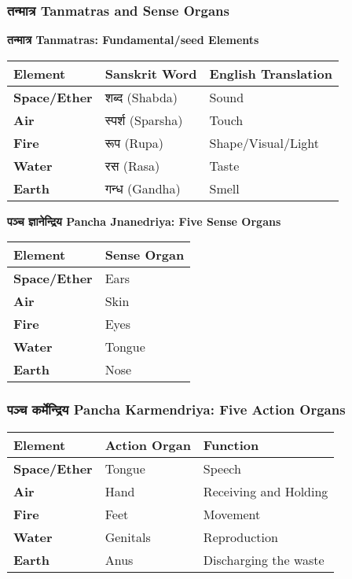 \begin{frame}[fragile]\frametitle{तन्मात्र Tanmatras and Sense Organs}
    \textbf{तन्मात्र Tanmatras: Fundamental/seed Elements}
	
	
    \begin{tabular}{|l|l|l|}
    \hline
    \textbf{Element} & \textbf{Sanskrit Word} & \textbf{English Translation} \\
    \hline
    \textbf{Space/Ether} & शब्द (Shabda) & Sound \\
    \hline
    \textbf{Air} & स्पर्श (Sparsha) & Touch \\
    \hline
    \textbf{Fire} & रूप (Rupa) & Shape/Visual/Light \\
    \hline
    \textbf{Water} & रस (Rasa) & Taste \\
    \hline
    \textbf{Earth} & गन्ध (Gandha) & Smell \\
    \hline
    \end{tabular}


    \textbf{पञ्च  ज्ञानेन्द्रिय  Pancha Jnanedriya: Five Sense Organs}
	
    \begin{tabular}{|l|l|}
    \hline
    \textbf{Element} & \textbf{Sense Organ} \\
    \hline
    \textbf{Space/Ether} & Ears \\
    \hline
    \textbf{Air} & Skin \\
    \hline
    \textbf{Fire} & Eyes \\
    \hline
    \textbf{Water} & Tongue \\
    \hline
    \textbf{Earth} & Nose \\
    \hline
    \end{tabular}
\end{frame}

\begin{frame}[fragile]\frametitle{पञ्च कर्मेन्द्रिय Pancha Karmendriya: Five Action Organs}
    \begin{tabular}{|l|l|l|}
    \hline
    \textbf{Element} & \textbf{Action Organ} & \textbf{Function} \\
    \hline
    \textbf{Space/Ether} & Tongue & Speech \\
    \hline
    \textbf{Air} & Hand & Receiving and Holding \\
    \hline
    \textbf{Fire} & Feet & Movement \\
    \hline
    \textbf{Water} & Genitals & Reproduction \\
    \hline
    \textbf{Earth} & Anus & Discharging the waste \\
    \hline
    \end{tabular}
\end{frame}

